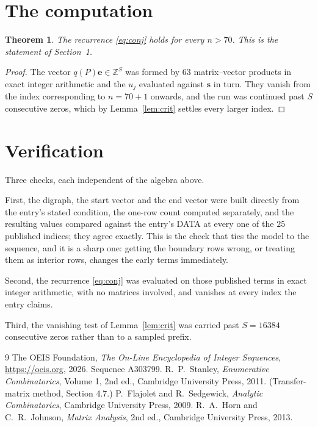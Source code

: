 \documentclass[11pt,a4paper]{article}
\theoremstyle{plain}
\newtheorem{theorem}{Theorem}
\theoremstyle{definition}
\begin{document}
\section{The computation}

\begin{theorem}
The recurrence \eqref{eq:conj} holds for every $n>70$. This is the statement of
Section~1.
\end{theorem}

\begin{proof}
The vector $q(P)\mathbf{e}\in\mathbb{Z}^{S}$ was formed by $63$ matrix--vector
products in exact integer arithmetic and the $u_j$ evaluated against $\mathbf{s}$ in turn.
They vanish from the index corresponding to $n=70+1$ onwards, and the run was continued
past $S$ consecutive zeros, which by Lemma~\ref{lem:crit} settles every larger index.
\end{proof}

\section{Verification}

Three checks, each independent of the algebra above.

First, the digraph, the start vector and the end vector were built directly from the
entry's stated condition, the one-row count computed separately, and the resulting values
compared against the entry's DATA at every one of the $25$ published indices; they
agree exactly. This is the check that ties the model to the sequence, and it is a sharp one:
getting the boundary rows wrong, or treating them as interior rows, changes the early terms
immediately.

Second, the recurrence \eqref{eq:conj} was evaluated on those published terms in exact
integer arithmetic, with no matrices involved, and vanishes at every index the entry claims.

Third, the vanishing test of Lemma~\ref{lem:crit} was carried past $S=16384$ consecutive
zeros rather than to a sampled prefix.

\begin{thebibliography}{9}
 The OEIS Foundation, \emph{The On-Line Encyclopedia of Integer
Sequences}, \url{https://oeis.org}, 2026. Sequence A303799.
 R.~P.~Stanley, \emph{Enumerative Combinatorics}, Volume 1, 2nd ed.,
Cambridge University Press, 2011. (Transfer-matrix method, Section 4.7.)
 P.~Flajolet and R.~Sedgewick, \emph{Analytic Combinatorics}, Cambridge
University Press, 2009.
 R.~A.~Horn and C.~R.~Johnson, \emph{Matrix Analysis}, 2nd ed., Cambridge
University Press, 2013.
\end{thebibliography}
\end{document}
